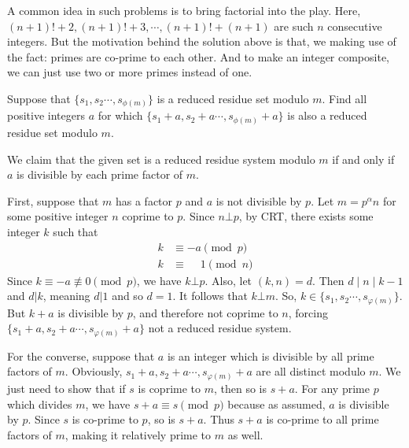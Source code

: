 \documentclass{subfile}
\begin{document}
		\begin{note}
			A common idea in such problems is to bring factorial into the play. Here, $(n+1)!+2,(n+1)!+3,\cdots,(n+1)!+(n+1)$ are such $n$ consecutive integers. But the motivation behind the solution above is that, we making use of the fact: primes are co-prime to each other. And to make an integer composite, we can just use two or more primes instead of one.
		\end{note}
		
		\begin{problem}
			Suppose that $ \{s_1,s_2\cdots , s_{\phi(m)}\} $ is a reduced residue set modulo $m$. Find all positive integers $a$ for which $ \{s_1+a,s_2+a\cdots , s_{\phi(m)}+a\} $ is also a reduced residue set modulo $m$.
		\end{problem}
		
		\begin{solution}
			We claim that the given set is a reduced residue system modulo $m$ if and only if $a$ is divisible by each prime factor of $m$. 
			
			First, suppose that $m$ has a factor $p$ and $a$ is not divisible by $p$. Let $m=p^{\alpha}n$ for some positive integer $n$ coprime to $p$. Since $n \bot p$, by CRT, there exists some integer $k$ such that
				\begin{align*}
					k &\equiv -a \pmod p\\
					k &\equiv \phantom{-}1  \pmod n
				\end{align*}
			Since $k \equiv -a \not \equiv 0 \pmod p$, we have $k \bot p$. Also, let $(k,n)=d$. Then $d\mid n\mid k-1$ and $d|k$, meaning $d|1$ and so $d=1$. It follows that $k \bot m$. So, $k \in \{s_1,s_2\cdots , s_{\varphi(m)}\} $. But $k+a$ is divisible by $p$, and therefore not coprime to $n$, forcing $ \{s_1+a,s_2+a\cdots , s_{\varphi(m)}+a\} $ not a reduced residue system.
			
			For the converse, suppose that $a$ is an integer which is divisible by all prime factors of $m$. Obviously, $s_1+a,s_2+a\cdots , s_{\varphi(m)}+a$ are all distinct modulo $m$. We just need to show that if $s$ is coprime to $m$, then so is $s+a$. For any prime $p$ which divides $m$, we have $s+a \equiv s \pmod p$ because as assumed, $a$ is divisible by $p$. Since $s$ is co-prime to $p$, so is $s+a$. Thus $s+a$ is co-prime to all prime factors of $m$, making it relatively prime to $m$ as well. 
		\end{solution}
		
\end{document}
